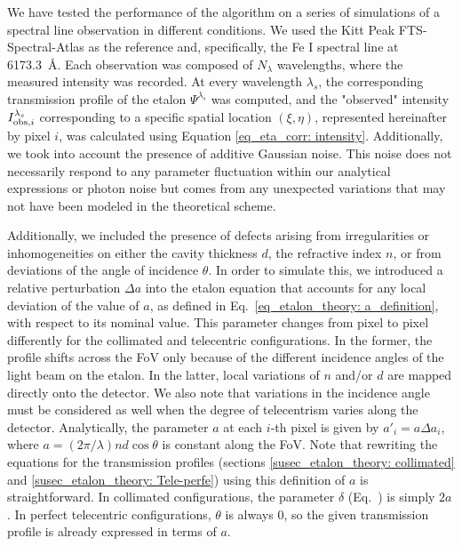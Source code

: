 We have tested the performance of the algorithm on a series of simulations of a spectral line observation in different conditions. We used the Kitt Peak FTS-Spectral-Atlas as the reference \citep{fts} and, specifically, the Fe I spectral line at 6173.3~\r{A}. Each observation was composed of $N_\lambda$ wavelengths, where the measured intensity was recorded. At every wavelength $\lambda_s$, the corresponding transmission profile of the etalon $\Psi^{\lambda_s}$ was computed, and the "observed" intensity $I ^{\lambda _ s} _ {{\rm obs}, i}$ corresponding to a specific spatial location $(\xi, \eta)$, represented hereinafter by pixel $i$, was calculated using Equation \eqref{eq_eta_corr: intensity}. Additionally, we took into account the presence of additive Gaussian noise. This noise does not necessarily respond to any parameter fluctuation within our analytical expressions or photon noise but comes from any unexpected variations that may not have been modeled in the theoretical scheme.

Additionally, we included the presence of defects arising from irregularities or inhomogeneities on either the cavity thickness $d$, the refractive index $n$, or from deviations of the angle of incidence $\theta$. In order to simulate this, we introduced a relative perturbation $\Delta a$ into the etalon equation that accounts for any local deviation of the value of $a$, as defined in Eq.~\eqref{eq_etalon_theory: a_definition}, with respect to its nominal value. This parameter changes from pixel to pixel differently for the collimated and telecentric configurations. In the former, the profile shifts across the FoV only because of the different incidence angles of the light beam on the etalon. In the latter, local variations of $n$ and/or $d$ are mapped directly onto the detector. We also note that variations in the incidence angle must be considered as well when the degree of telecentrism varies along the detector. Analytically, the parameter $a$ at each $i$-th pixel is given by $a' _ i = a \Delta a _ i$, where $a = (2\pi/\lambda) n d\cos\theta$ is constant along the FoV. Note that rewriting the equations for the transmission profiles (sections \ref{susec_etalon_theory: collimated} and \ref{susec_etalon_theory: Tele-perfe}) using this definition of $a$ is straightforward. In collimated configurations, the parameter $\delta$ (Eq.~) is simply $2a$. In perfect telecentric configurations, $\theta$ is always 0, so the given transmission profile is already expressed in terms of $a$.   

